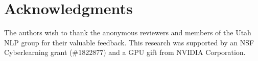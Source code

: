 \documentclass[11pt,a4paper]{article}
\title{\mytitle}
\author{
  Jie Cao${^\dagger}$,
  Michael Tanana${^\ddagger}$,
  Zac E. Imel${^\ddagger}$,
  Eric Poitras${^\ddagger}$,\\
  {\bf David C. Atkins}${^\diamondsuit}$,
  {\bf Vivek Srikumar}${^\dagger}$\\
  ${^\dagger}$School of Computing, University of Utah\\
  ${^\ddagger}$Department of Educational Psychology, University of Utah\\
  ${^\diamondsuit}$Department of Psychiatry and Public Health, University of Washington\\
  \texttt{\{jcao, svivek\}@cs.utah.edu,}\\
  \texttt{\{michael.tanana, zac.imel, eric.poitras\}@utah.edu,}\\
  \texttt{datkins@u.washington.edu}
 }
\date{}
\begin{document}
\maketitle











% 





%



\section*{Acknowledgments}
The authors wish to thank the anonymous reviewers and members of the
Utah NLP group for their valuable feedback. This research was
supported by an NSF Cyberlearning grant (\#1822877) and a GPU gift
from NVIDIA Corporation.






\end{document}
